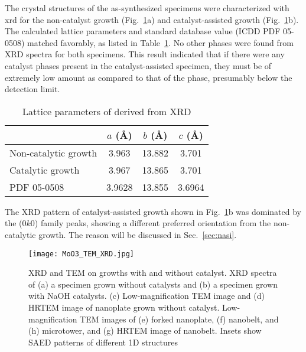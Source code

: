 The crystal structures of the as-synthesized specimens were characterized with \gls{xrd} for the non-catalyst growth (Fig.~\ref{fig:ch4tem3by3}a) and catalyst-assisted growth (Fig.~\ref{fig:ch4tem3by3}b). The calculated lattice parameters and standard database value (ICDD PDF 05-0508) matched favorably, as listed in Table~\ref{tab:ch4xrd}. No other phases were found from XRD spectra for both specimens. This result indicated that if there were any catalyst phases present in the catalyst-assisted specimen, they must be of extremely low amount as compared to that of the  phase, presumably below the detection limit. 
\begin{table}[htb]
\centering
\caption{Lattice parameters of  derived from XRD}\label{tab:ch4xrd}
\begin{tabular}{lccc}
\toprule
           & $a$ (\AA) & $b$ (\AA) & $c$ (\AA)   \\
\midrule
Non-catalytic growth  & 3.963    & 13.882 & 3.701  \\
Catalytic growth  & 3.967    & 13.865 & 3.701  \\
PDF 05-0508       & 3.9628    & 13.855 & 3.6964  \\
\bottomrule
\end{tabular}
\end{table}
The XRD pattern of catalyst-assisted growth shown in Fig.~\ref{fig:ch4tem3by3}b was dominated by the (0$k$0) family peaks, showing a different preferred orientation from the non-catalytic growth. The reason will be discussed in Sec.~\ref{sec:nasi}. 
\begin{figure}[htb]
\centering
\texttt{[image: MoO3\_TEM\_XRD.jpg]}
\caption[XRD and TEM on  growths with and without catalyst]{XRD and TEM on  growths with and without catalyst. XRD spectra of (a) a specimen grown without catalysts and (b) a specimen grown with NaOH catalysts. (c) Low-magnification TEM image and (d) HRTEM image of nanoplate grown without catalyst. Low-magnification TEM images of (e) forked nanoplate, (f) nanobelt, and (h) microtower, and (g) HRTEM image of nanobelt. Insets show SAED patterns of different  1D structures}
\label{fig:ch4tem3by3}
\end{figure}
